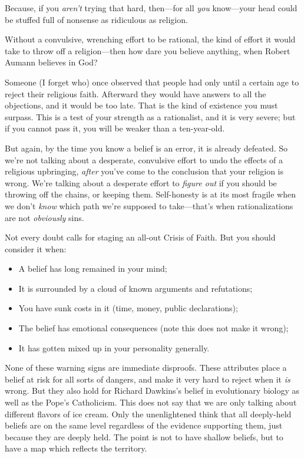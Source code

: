 {
 Because, if you \textit{aren't} trying that hard,
then---for all \textit{you} know---your head could be stuffed full of
nonsense as ridiculous as religion.}

{
 Without a convulsive, wrenching effort to be rational, the kind of
effort it would take to throw off a religion---then how dare you
believe anything, when Robert Aumann believes in God?}

{
 Someone (I forget who) once observed that people had only until a
certain age to reject their religious faith. Afterward they would have
answers to all the objections, and it would be too late. That is the
kind of existence you must surpass. This is a test of your strength as
a rationalist, and it is very severe; but if you cannot pass it, you
will be weaker than a ten-year-old.}

{
 But again, by the time you know a belief is an error, it is
already defeated. So we're not talking about a
desperate, convulsive effort to undo the effects of a religious
upbringing, \textit{after} you've come to the
conclusion that your religion is wrong. We're talking
about a desperate effort to \textit{figure out} if you should be
throwing off the chains, or keeping them. Self-honesty is at its most
fragile when we don't \textit{know} which path
we're supposed to take---that's when
rationalizations are not \textit{obviously} sins.}

{
 Not every doubt calls for staging an all-out Crisis of Faith. But
you should consider it when:}

\begin{itemize}
\item {
 A belief has long remained in your mind;}

\item {
 It is surrounded by a cloud of known arguments and refutations;}

\item {
 You have sunk costs in it (time, money, public declarations);}

\item {
 The belief has emotional consequences (note this does not make it
wrong);}

\item {
  It has gotten mixed up in your personality generally.}
\end{itemize}

{
 None of these warning signs are immediate disproofs. These
attributes place a belief at risk for all sorts of dangers, and make it
very hard to reject when it \textit{is} wrong. But they also hold for
Richard Dawkins's belief in evolutionary biology as
well as the Pope's Catholicism. This does not say that
we are only talking about different flavors of ice cream. Only the
unenlightened think that all deeply-held beliefs are on the same level
regardless of the evidence supporting them, just because they are
deeply held. The point is not to have shallow beliefs, but to have a
map which reflects the territory.}

